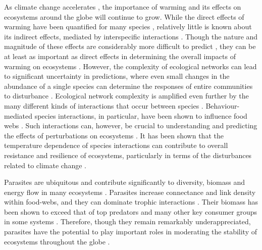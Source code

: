 As climate change accelerates \citep{ipcc2014}, the importance of warming and its effects on ecosystems around the globe will continue to grow. While the direct effects of warming have been quantified for many species \citep{wernberg2012}, relatively little is known about its indirect effects, mediated by interspecific interactions \citep{shaver2000, post2008}. Though the nature and magnitude of these effects are considerably more difficult to predict \citep{sanford1999, wernberg2012}, they can be at least as important as direct effects in determining the overall impacts of warming on ecosystems \citep{chapin1983, post2008, donohue2017, kordas2017}. However, the complexity of ecological networks can lead to significant uncertainty in predictions, where even small changes in the abundance of a single species can determine the responses of entire communities to disturbance \citep{saterberg2013, mrowicki2016}. Ecological network complexity is amplified even further by the many different kinds of interactions that occur between species \citep{kefi2012}. Behaviour-mediated species interactions, in particular, have been shown to influence food webs \citep{schmitz1997}. Such interactions can, however, be crucial to understanding and predicting the effects of perturbations on ecosystems \citep{mcclean2015, suraci2016, donohue2017}. It has been shown that the temperature dependence of species interactions can contribute to overall resistance and resilience of ecosystems, particularly in terms of the disturbances related to climate change \citep{kordas2011, dell2014}. 

Parasites are ubiquitous \citep{torchin2004} and contribute significantly to diversity, biomass and energy flow in many ecosystems \citep{ lafferty2006parasites,  kruis2008, dunne2013, grabner2017}. Parasites increase connectance and link density within food-webs, and they can dominate trophic interactions \citep{lafferty2006parasites, amundsen2009}. Their biomass has been shown to exceed that of top predators and many other key consumer groups in some systems \citep{kruis2008, preston2013}. Therefore, though they remain remarkably underappreciated, parasites have the potential to play important roles in moderating the stability of ecosystems throughout the globe \citep{dunne2013}. 

